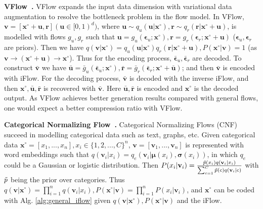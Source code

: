 \documentclass{article}
\newcommand{\quant}[1]{\bar{#1}}
\newcommand{\qv}[1]{\bar{\mathbf{#1}}}
\begin{document}
\textbf{VFlow~\cite{chen2020vflow}.} VFlow expands the input data dimension with variational data augmentation to resolve the bottleneck problem in the flow model. In VFlow, $\mathbf{v} = [\mathbf{x}^\circ+\mathbf{u}, \mathbf{r}] (\mathbf{u} \in [0,1)^d)$, where $\mathbf{u} \sim q_u(\mathbf{u} | \mathbf{x}^\circ), \mathbf{r} \sim q_r(\mathbf{r} | \mathbf{x}^\circ + \mathbf{u})$, is modelled with flows $g_u, g_r$ such that $\mathbf{u} = g_u (\bm{\epsilon}_u; \mathbf{x}^\circ), \mathbf{r} = g_r (\bm{\epsilon}_r; \mathbf{x}^\circ + \mathbf{u})$ ($                                                              \bm{\epsilon}_u, \bm{\epsilon}_r$ are priors). Then we have $q(\mathbf{v} | \mathbf{x}^\circ) = q_u(\mathbf{u} | \mathbf{x}^\circ) q_r(\mathbf{r} | \mathbf{x}^\circ + \mathbf{u}), P(\mathbf{x}^\circ | \mathbf{v}) = 1$ (as $\mathbf{v} \to (\mathbf{x}^\circ + \mathbf{u}) \to \mathbf{x}^\circ$). Thus for the encoding process, $\quant{\bm{\epsilon}}_u, \quant{\bm{\epsilon}}_r$ are decoded. To construct $\qv{v}$ we have $\qv{u} = \quant{g}_u (\bar{\bm{\epsilon}}_u; \mathbf{x}^\circ), \qv{r} = \quant{g}_r (\quant{\bm{\epsilon}}_r; \mathbf{x}^\circ + \qv{u})$; and then $\qv{v}$ is encoded with iFlow. For the decoding process, $\qv{v}$ is decoded with the inverse iFlow, and then $\mathbf{x}^\circ, \qv{u}, \qv{r}$ is recovered with $\qv{v}$. Here $\qv{u}, \qv{r}$ is encoded and $\mathbf{x}^\circ$ is the decoded output. As VFlow achieves better generation results compared with general flows, one would expect a better compression ratio with VFlow.

\textbf{Categorical Normalizing Flow~\cite{lippe2020categorical}.} Categorical Normalizing Flows (CNF) succeed in modelling categorical data such as text, graphs, etc. Given categorical data $\mathbf{x}^\circ = [x_1, ..., x_n], x_i \in \{1,2,...,C\}^n$, $\mathbf{v} = [\mathbf{v}_1, ..., \mathbf{v}_n]$ is represented with word embeddings such that $q(\mathbf{v}_i | x_i) = q_e (\mathbf{v}_i | \bm{\mu}(x_i), \bm{\sigma}(x_i))$, in which $q_e$ could be a Gaussian or logistic distribution. Then $P(x_i | \mathbf{v}_i) = \frac{\Tilde{p}(x_i) q(\mathbf{v}_i | x_i)}{\sum_{c=1}^C \Tilde{p}(c) q(\mathbf{v}_i | c)} $ with $\Tilde{p}$ being the prior over categories. Thus $q(\mathbf{v} | \mathbf{x}^\circ) = \prod_{i=1}^n q(\mathbf{v}_i | x_i), P(\mathbf{x}^\circ | \mathbf{v}) = \prod_{i=1}^n P(x_i | \mathbf{v}_i)$, and $\mathbf{x}^\circ$ can be coded with Alg. \ref{alg:general_iflow} given $q(\mathbf{v} | \mathbf{x}^\circ), P(\mathbf{x}^\circ | \mathbf{v})$ and the iFlow.
\end{document}
